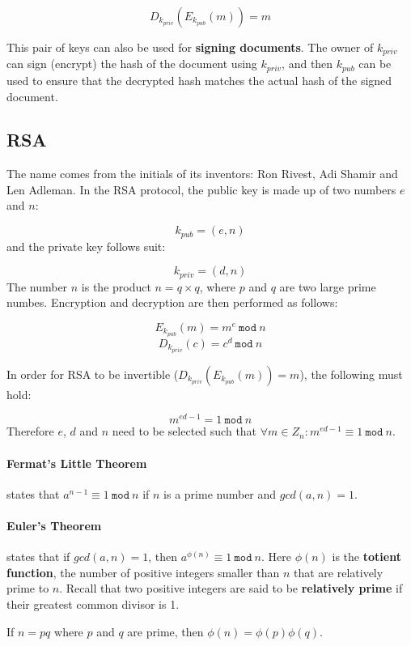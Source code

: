 \documentclass[12pt, letterpaper]{article}
\begin{document}
\[
  D_{k_{priv}} (E_{k_{pub}} (m)) = m
\]

This pair of keys can also be used for \textbf{signing documents}.
The owner of $k_{priv}$ can sign (encrypt) the hash of the document using $k_{priv}$, and then $k_{pub}$ can be used to ensure that the decrypted hash matches the actual hash of the signed document.

\subsection{RSA}

The name comes from the initials of its inventors: Ron Rivest, Adi Shamir and Len Adleman.
In the RSA protocol, the public key is made up of two numbers $e$ and $n$:

\[
  k_{pub} = (e, n)
\]
and the private key follows suit:

\[
  k_{priv} = (d, n)
\]
The number $n$ is the product $n = q \times q$, where $p$ and $q$ are two large prime numbes.
Encryption and decryption are then performed as follows:

\[
  E_{k_{pub}} (m) = m^e \: \mathtt{mod} \: n
\]
\[
  D_{k_{priv}} (c) = c^d \: \mathtt{mod} \: n
\]

In order for RSA to be invertible ($D_{k_{priv}} (E_{k_{pub}} (m)) = m$), the following must hold:

\[
  m^{ed - 1} = 1 \: \mathtt{mod} \: n
\]
Therefore $e$, $d$ and $n$ need to be selected such that $\forall m \in Z_n: m^{ed-1} \equiv 1 \: \mathtt{mod} \: n$.

\paragraph{Fermat's Little Theorem} states that $a^{n-1} \equiv 1 \: \mathtt{mod} \: n$ if $n$ is a prime number and $gcd(a, n) = 1$.

\paragraph{Euler's Theorem} states that if $gcd(a, n) = 1$, then $a^{\phi(n)} \equiv 1 \: \mathtt{mod} \: n$.
Here $\phi(n)$ is the \textbf{totient function}, the number of positive integers smaller than $n$ that are relatively prime to $n$.
Recall that two positive integers are said to be \textbf{relatively prime} if their greatest common divisor is 1.

If $n = pq$ where $p$ and $q$ are prime, then $\phi(n) = \phi(p) \phi(q)$.
\end{document}
